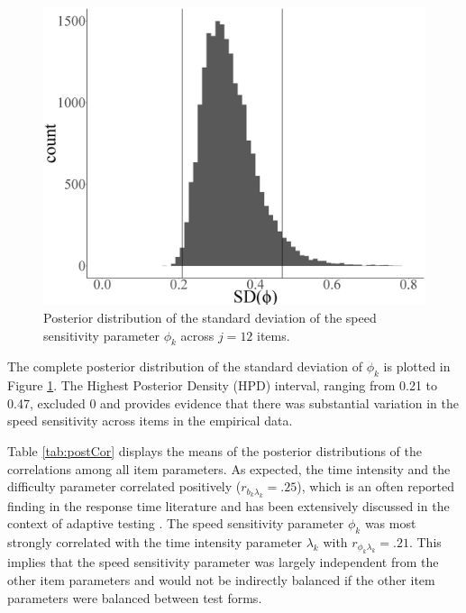 \documentclass[a4paper,man,apacite,donotrepeattitle]{apa6}
\begin{document}
\begin{figure} [!htb]
\begin{center}
	\includegraphics[height = 0.3\textheight]{phi_dist.eps}
	\end{center}
	\caption{Posterior distribution of the standard deviation of the speed sensitivity parameter $\phi_{k}$ across $j=12$ items.}
	\label{fig:post_phi}
\end{figure}

The complete posterior distribution of the standard deviation of $\phi_{k}$ is plotted in Figure \ref{fig:post_phi}. The Highest Posterior Density (HPD) interval, ranging from 0.21 to 0.47, excluded 0 and provides evidence that there was substantial variation in the speed sensitivity across items in the empirical data. 

Table \ref{tab:postCor} displays the means of the posterior distributions of the correlations among all item parameters. As expected, the time intensity and the difficulty parameter correlated positively ($r_{b_{k}  \lambda_{k}} = .25$), which is an often reported finding in the response time literature and has been extensively discussed in the context of adaptive testing \cite{vanderLinden.2013}. The speed sensitivity parameter $\phi_{k}$ was most strongly correlated with the time intensity parameter $\lambda_{k}$ with $r_{\phi_{k}  \lambda_{k}} = .21$. This implies that the speed sensitivity parameter was largely independent from the other item parameters and would not be indirectly balanced if the other item parameters were balanced between test forms.
\end{document}
